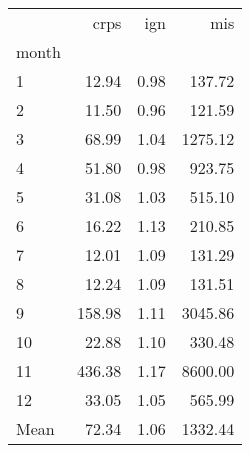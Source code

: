 \begin{tabular}{lrrr}
\toprule
 & crps & ign & mis \\
month &  &  &  \\
\midrule
1 & 12.94 & 0.98 & 137.72 \\
2 & 11.50 & 0.96 & 121.59 \\
3 & 68.99 & 1.04 & 1275.12 \\
4 & 51.80 & 0.98 & 923.75 \\
5 & 31.08 & 1.03 & 515.10 \\
6 & 16.22 & 1.13 & 210.85 \\
7 & 12.01 & 1.09 & 131.29 \\
8 & 12.24 & 1.09 & 131.51 \\
9 & 158.98 & 1.11 & 3045.86 \\
10 & 22.88 & 1.10 & 330.48 \\
11 & 436.38 & 1.17 & 8600.00 \\
12 & 33.05 & 1.05 & 565.99 \\
Mean & 72.34 & 1.06 & 1332.44 \\
\bottomrule
\end{tabular}
